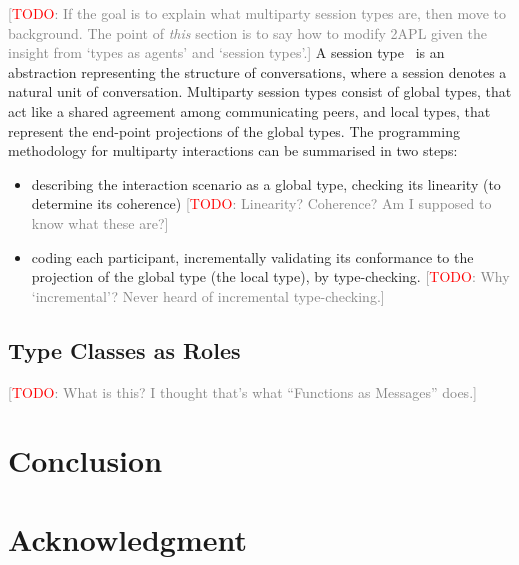 \documentclass[conference,compsoc]{IEEEtran} %
\newcommand{\todo}[1]{{\small \textcolor{gray}{[\textcolor{red}{TODO}: #1]}}}
\begin{document}
\todo{If the goal is to explain what multiparty session types are, then
move to background. The point of \emph{this} section is to say how to
modify 2APL given the insight from `types as agents' and `session types'.}
A session type~\cite{dblp:conf/popl/hondayc08} is an abstraction
representing the structure of conversations, where a session denotes a
natural unit of conversation.  Multiparty session types consist of global
types, that act like a shared agreement among communicating peers, and
local types, that represent the end-point projections of the global types.
The programming methodology for multiparty interactions can be summarised
in two steps:

\begin{itemize}
   \item{ describing the
interaction scenario as a global type, checking its linearity (to
determine its coherence)} \todo{Linearity? Coherence? Am I supposed to know
what these are?}
   \item{coding each participant, incrementally validating its conformance
   to the projection of the global type (the local type), by type-checking.}
   \todo{Why `incremental'? Never heard of incremental type-checking.}
\end{itemize}

\subsection{Type Classes as Roles} %

\todo{What is this? I thought that's what ``Functions as Messages'' does.}

\section{Conclusion} %

\section*{Acknowledgment}




\end{document}
